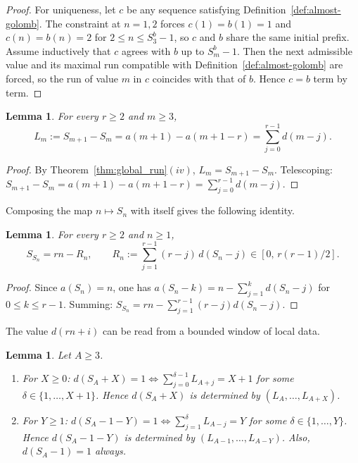 \documentclass[12pt]{article}
\newtheorem{lemma}[theorem]{Lemma}
\theoremstyle{definition}
\theoremstyle{remark}
\begin{document}
\begin{proof}
For uniqueness, let $c$ be any sequence satisfying
Definition~\ref{def:almost-golomb}.
The constraint at $n=1,2$ forces $c(1)=b(1)=1$ and $c(n)=b(n)=2$
for $2\le n\le S_3^b-1$, so $c$ and $b$ share the same initial prefix.
Assume inductively that $c$ agrees with $b$ up to $S_m^b-1$.
Then the next admissible value and its maximal run compatible with
Definition~\ref{def:almost-golomb} are forced, so the run of value $m$
in $c$ coincides with that of $b$.
Hence $c=b$ term by term.
\end{proof}

\begin{lemma}\label{lem:runlength-d}
For every $r\ge 2$ and $m\ge 3$,
\[
  L_m:=S_{m+1}-S_m=a(m+1)-a(m+1-r)=\sum_{j=0}^{r-1} d(m-j).
\]
\end{lemma}

\begin{proof}
By Theorem~\ref{thm:global_run}$(iv)$, $L_m=S_{m+1}-S_m$.
Telescoping: $S_{m+1}-S_m=a(m+1)-a(m+1-r)=\sum_{j=0}^{r-1}d(m-j)$.
\end{proof}

Composing the map $n\mapsto S_n$ with itself gives the following identity.

\begin{lemma}\label{lem:nested-anchor}
For every $r\ge 2$ and $n\ge 1$,
\[
  S_{S_n}=rn-R_n, \qquad R_n:=\sum_{j=1}^{r-1}(r-j)\,d(S_n-j)\in[0,\,r(r-1)/2].
\]
\end{lemma}

\begin{proof}
Since $a(S_n)=n$, one has $a(S_n-k)=n-\sum_{j=1}^{k}d(S_n-j)$ for $0\le k\le r-1$.
Summing: $S_{S_n}=rn-\sum_{j=1}^{r-1}(r-j)d(S_n-j)$.
\end{proof}

The value $d(rn+i)$ can be read from a bounded window of local data.

\begin{lemma}\label{lem:local_projection}
Let $A\ge 3$.
\begin{enumerate}[label=(\roman*)]
  \item For $X\ge 0$: $d(S_A+X)=1\iff \sum_{j=0}^{\delta-1}L_{A+j}=X+1$
    for some $\delta\in\{1,\ldots,X+1\}$.
    Hence $d(S_A+X)$ is determined by $(L_A,\ldots,L_{A+X})$.
  \item For $Y\ge 1$: $d(S_A-1-Y)=1\iff \sum_{j=1}^{\delta}L_{A-j}=Y$
    for some $\delta\in\{1,\ldots,Y\}$.
    Hence $d(S_A-1-Y)$ is determined by $(L_{A-1},\ldots,L_{A-Y})$.
    Also, $d(S_A-1)=1$ always.
\end{enumerate}
\end{lemma}
\end{document}

